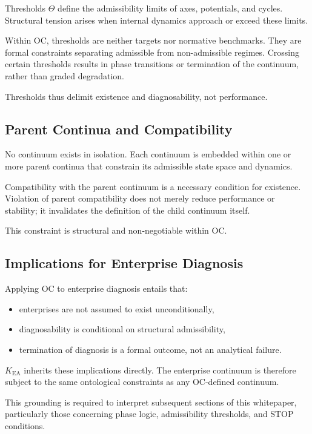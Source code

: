 Thresholds $\Theta$ define the admissibility limits of axes, potentials,
and cycles.
Structural tension arises when internal dynamics approach or exceed
these limits.

Within OC, thresholds are neither targets nor normative benchmarks.
They are formal constraints separating admissible from non-admissible
regimes.
Crossing certain thresholds results in phase transitions or termination
of the continuum, rather than graded degradation.

Thresholds thus delimit existence and diagnosability, not performance.

\subsection{Parent Continua and Compatibility}

No continuum exists in isolation.
Each continuum is embedded within one or more parent continua that
constrain its admissible state space and dynamics.

Compatibility with the parent continuum is a necessary condition for
existence.
Violation of parent compatibility does not merely reduce performance or
stability; it invalidates the definition of the child continuum itself.

This constraint is structural and non-negotiable within OC.

\subsection{Implications for Enterprise Diagnosis}

Applying OC to enterprise diagnosis entails that:
\begin{itemize}
  \item enterprises are not assumed to exist unconditionally,
  \item diagnosability is conditional on structural admissibility,
  \item termination of diagnosis is a formal outcome, not an analytical
        failure.
\end{itemize}

$K_{\mathrm{EA}}$ inherits these implications directly.
The enterprise continuum is therefore subject to the same ontological
constraints as any OC-defined continuum.

This grounding is required to interpret subsequent sections of this
whitepaper, particularly those concerning phase logic, admissibility
thresholds, and STOP conditions.

